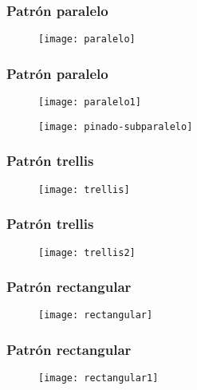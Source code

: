 \documentclass[14pt]{beamer}
\begin{document}
 \begin{frame}
\frametitle{Patrón paralelo}
 \begin{figure}
    \centering
    \texttt{[image: paralelo]}
  \end{figure}
\end{frame}
 \begin{frame}
\frametitle{Patrón paralelo}
 \begin{figure}
    \centering
    \texttt{[image: paralelo1]}
  \end{figure}
\end{frame}
 \begin{frame}
 \begin{figure}
    \centering
    \texttt{[image: pinado-subparalelo]}
  \end{figure}
\end{frame}
 \begin{frame}
 \frametitle{Patrón trellis}
 \begin{figure}
    \centering
    \texttt{[image: trellis]}
  \end{figure}
\end{frame}
 \begin{frame}
 \frametitle{Patrón trellis}
 \begin{figure}
    \centering
    \texttt{[image: trellis2]}
  \end{figure}
\end{frame}
 \begin{frame}
 \frametitle{Patrón rectangular}
 \begin{figure}
    \centering
    \texttt{[image: rectangular]}
  \end{figure}
\end{frame}
\begin{frame}
 \frametitle{Patrón rectangular}
 \begin{figure}
    \centering
    \texttt{[image: rectangular1]}
  \end{figure}
\end{frame}
\end{document}
